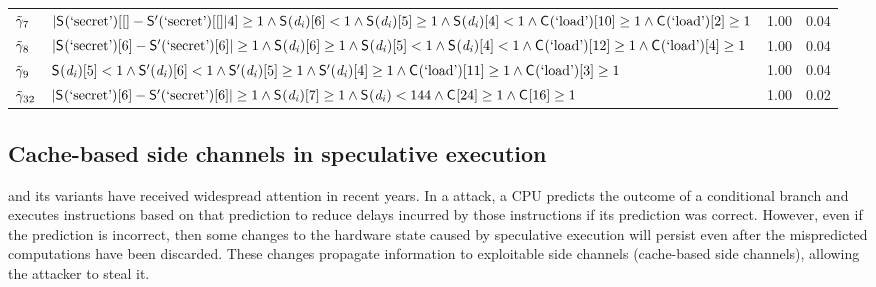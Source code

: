 \begin{table}
{\begin{tabular}{m{\colR}m{\colRule}m{\colPrecision}m{\colRecall}}
${\tilde{\gamma}}_{7}$&$|\mathsf{S}_{}(\textrm{`secret'})[[]-\mathsf{S}'_{}(\textrm{`secret'})[[]|4]\ge 1 \wedge \mathsf{S}_{}(\mathit{d_{i}})[6]< 1 \wedge \mathsf{S}_{}(\mathit{d_{i}})[5]\ge 1 \wedge \mathsf{S}_{}(\mathit{d_{i}})[4]< 1 \wedge \mathsf{C}_{}(\textrm{`load'})[10]\ge 1 \wedge \mathsf{C}_{}(\textrm{`load'})[2]\ge 1$&1.00&0.04\\
${\tilde{\gamma}}_{8}$&$|\mathsf{S}_{}(\textrm{`secret'})[6]-\mathsf{S}'_{}(\textrm{`secret'})[6]|\ge 1 \wedge \mathsf{S}_{}(\mathit{d_{i}})[6]\ge 1 \wedge \mathsf{S}_{}(\mathit{d_{i}})[5]< 1 \wedge \mathsf{S}_{}(\mathit{d_{i}})[4]< 1 \wedge \mathsf{C}_{}(\textrm{`load'})[12]\ge 1 \wedge \mathsf{C}_{}(\textrm{`load'})[4]\ge 1$&1.00&0.04\\
${\tilde{\gamma}}_{9}$&$\mathsf{S}_{}(\mathit{d_{i}})[5]< 1 \wedge \mathsf{S}'_{}(\mathit{d_{i}})[6]< 1 \wedge \mathsf{S}'_{}(\mathit{d_{i}})[5]\ge 1 \wedge \mathsf{S}'_{}(\mathit{d_{i}})[4]\ge 1 \wedge \mathsf{C}_{}(\textrm{`load'})[11]\ge 1 \wedge \mathsf{C}_{}(\textrm{`load'})[3]\ge 1$&1.00&0.04\\
${\tilde{\gamma}}_{32}$&$|\mathsf{S}_{}(\textrm{`secret'})[6]-\mathsf{S}'_{}(\textrm{`secret'})[6]|\ge 1 \wedge \mathsf{S}_{}(\mathit{d_{i}})[7]\ge 1 \wedge \mathsf{S}_{}(\mathit{d_{i}})< 144 \wedge \mathsf{C}_{}[24]\ge 1 \wedge \mathsf{C}_{}[16]\ge 1$&1.00&0.02\\
\bottomrule
\end{tabular}
}
\endgroup
\end{table}
\fi

\subsection{Cache-based side channels in speculative execution}
\label{dinome:sec:exp:spectre}

\spectre and its variants have received widespread attention in recent
years.  In a \spectre attack, a CPU predicts the outcome of a
conditional branch and executes instructions based on that prediction
to reduce delays incurred by those instructions if its prediction was
correct.  However, even if the prediction is incorrect, then some
changes to the hardware state caused by speculative execution will
persist even after the mispredicted computations have been discarded.
These changes propagate information to exploitable side channels
(cache-based side channels), allowing the attacker to steal it.

